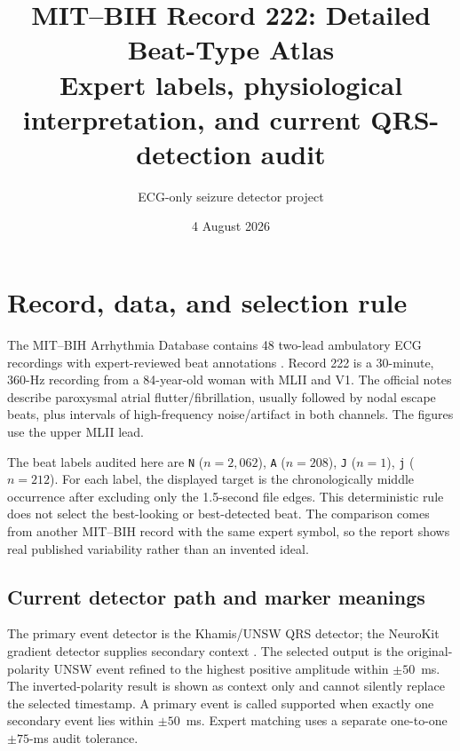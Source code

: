 \documentclass[11pt]{article}
\title{\textbf{MIT--BIH Record 222: Detailed Beat-Type Atlas}\\[0.35em]
        \large Expert labels, physiological interpretation, and current QRS-detection audit}
\author{ECG-only seizure detector project}
\date{4 August 2026}
\begin{document}
        \maketitle

        \begin{center}
        \end{center}

        \section{Record, data, and selection rule}

        The MIT--BIH Arrhythmia Database contains 48 two-lead ambulatory ECG recordings with expert-reviewed
        beat annotations \cite{goldberger2000physiobank,moody2001mitbih,physionetmitdb}. Record 222 is
        a 30-minute, 360-Hz recording from a 84-year-old woman with MLII and V1. The official notes describe paroxysmal atrial flutter/fibrillation, usually followed by nodal escape beats, plus intervals of high-frequency noise/artifact in both channels. The figures use the upper MLII lead.

        The beat labels audited here are \texttt{N} ($n=2,062$), \texttt{A} ($n=208$), \texttt{J} ($n=1$), \texttt{j} ($n=212$). For each label, the displayed target is the chronologically
        middle occurrence after excluding only the 1.5-second file edges. This deterministic rule does not
        select the best-looking or best-detected beat. The comparison comes from another MIT--BIH record with
        the same expert symbol, so the report shows real published variability rather than an invented ideal.

        \subsection{Current detector path and marker meanings}

        The primary event detector is the Khamis/UNSW QRS detector; the NeuroKit gradient detector supplies
        secondary context \cite{khamis2016telehealth,makowski2021neurokit,kristof2024qrs}. The selected
        output is the original-polarity UNSW event refined to the highest positive amplitude within $\pm50$~ms.
        The inverted-polarity result is shown as context only and cannot silently replace the selected timestamp.
        A primary event is called supported when exactly one secondary event lies within $\pm50$~ms. Expert
        matching uses a separate one-to-one $\pm75$-ms audit tolerance.
\end{document}
